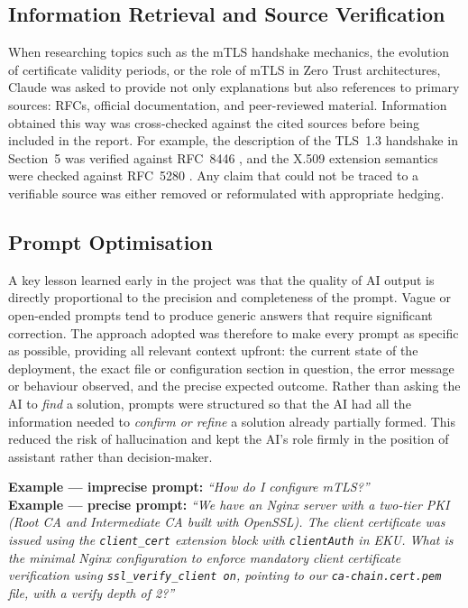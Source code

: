 \documentclass[10pt,twocolumn]{article}
\begin{document}
\subsection{Information Retrieval and Source Verification}

When researching topics such as the mTLS handshake mechanics, the evolution
of certificate validity periods, or the role of mTLS in Zero Trust
architectures, Claude was asked to provide not only explanations but also
references to primary sources: RFCs, official documentation, and peer-reviewed
material. Information obtained this way was cross-checked against the cited
sources before being included in the report. For example, the description
of the TLS~1.3 handshake in Section~5 was verified against RFC~8446
\cite{rfc8446}, and the X.509 extension semantics were checked against
RFC~5280 \cite{rfc5280}. Any claim that could not be traced to a verifiable
source was either removed or reformulated with appropriate hedging.

\subsection{Prompt Optimisation}

A key lesson learned early in the project was that the quality of AI output
is directly proportional to the precision and completeness of the prompt.
Vague or open-ended prompts tend to produce generic answers that require
significant correction. The approach adopted was therefore to make every
prompt as specific as possible, providing all relevant context upfront:
the current state of the deployment, the exact file or configuration
section in question, the error message or behaviour observed, and the
precise expected outcome. Rather than asking the AI to \emph{find} a
solution, prompts were structured so that the AI had all the information
needed to \emph{confirm or refine} a solution already partially formed.
This reduced the risk of hallucination and kept the AI's role firmly in the
position of assistant rather than decision-maker.

\begin{infobox}
\footnotesize
\textbf{Example --- imprecise prompt:}
\textit{``How do I configure mTLS?''}\\[4pt]
\textbf{Example --- precise prompt:}
\textit{``We have an Nginx server with a two-tier PKI (Root CA and
Intermediate CA built with OpenSSL). The client certificate was issued
using the \texttt{client\_cert} extension block with
\texttt{clientAuth} in EKU. What is the minimal Nginx configuration
to enforce mandatory client certificate verification using
\texttt{ssl\_verify\_client on}, pointing to our
\texttt{ca-chain.cert.pem} file, with a verify depth of 2?''}
\end{infobox}
\end{document}
